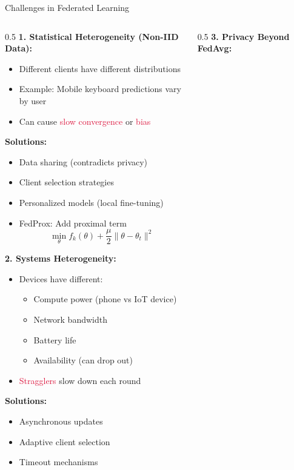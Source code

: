 \begin{frame}{Challenges in Federated Learning}
\begin{columns}
\begin{column}{0.5\textwidth}
\textbf{1. Statistical Heterogeneity (Non-IID Data):}

\begin{itemize}
\item Different clients have different distributions
\item Example: Mobile keyboard predictions vary by user
\item Can cause \textcolor{crimson}{slow convergence} or \textcolor{crimson}{bias}
\end{itemize}

\textbf{Solutions:}
\begin{itemize}
\item Data sharing (contradicts privacy)
\item Client selection strategies
\item Personalized models (local fine-tuning)
\item FedProx: Add proximal term
\[\min_\theta f_k(\theta) + \frac{\mu}{2}\|\theta - \theta_t\|^2\]
\end{itemize}

\vspace{0.3cm}
\textbf{2. Systems Heterogeneity:}

\begin{itemize}
\item Devices have different:
  \begin{itemize}
  \item Compute power (phone vs IoT device)
  \item Network bandwidth
  \item Battery life
  \item Availability (can drop out)
  \end{itemize}
\item \textcolor{crimson}{Stragglers} slow down each round
\end{itemize}

\textbf{Solutions:}
\begin{itemize}
\item Asynchronous updates
\item Adaptive client selection
\item Timeout mechanisms
\end{itemize}
\end{column}
\begin{column}{0.5\textwidth}
\textbf{3. Privacy Beyond FedAvg:}


\end{column}
\end{columns}
\end{frame}
